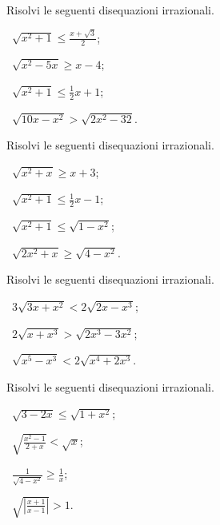 \begin{esercizio}[\Ast]
 \label{ese:8.23}
Risolvi le seguenti disequazioni irrazionali.
\begin{multicols}{2}
 \begin{enumeratea}
 \item~$\sqrt{x^2+1}\le \frac{x+\sqrt 3} 2$;
 \item~$\sqrt{x^2-5x}\ge x-4$;
 \item~$\sqrt{x^2+1}\le \frac 1 2x+1$;
 \item~$\sqrt{10x-x^2}>\sqrt{2x^2-32}$.
 \end{enumeratea}
 \end{multicols}
\end{esercizio}

\begin{esercizio}[\Ast]
 \label{ese:8.24}
Risolvi le seguenti disequazioni irrazionali.
\begin{multicols}{2}
 \begin{enumeratea}
 \item~$\sqrt{x^2+x}\ge x+3$;
 \item~$\sqrt{x^2+1}\le \frac 1 2x-1$;
 \item~$\sqrt{x^2+1}\le \sqrt{1-x^2}$;
 \item~$\sqrt{2x^2+x}\ge \sqrt{4-x^2}$.
 \end{enumeratea}
 \end{multicols}
\end{esercizio}
\pagebreak
\begin{esercizio}[\Ast]
 \label{ese:8.25}
Risolvi le seguenti disequazioni irrazionali.
\begin{multicols}{2}
 \begin{enumeratea}
 \item~$3\sqrt{3x+x^2}<2\sqrt{2x-x^3}$;
 \item~$2\sqrt{x+x^3}>\sqrt{2x^3-3x^2}$;
 \item~$\sqrt{x^5-x^3}<2\sqrt{x^4+2x^3}$.
 \end{enumeratea}
 \end{multicols}
\end{esercizio}

\begin{esercizio}[\Ast]
 \label{ese:8.26}
Risolvi le seguenti disequazioni irrazionali.
\begin{multicols}{2}
 \begin{enumeratea}
 \item~$\sqrt{3-2x}\le \sqrt{1+x^{2}}$;
 \item~$\sqrt{\frac{x^2-1}{2+x}}< \sqrt{x}$;
 \item~$\frac{1}{\sqrt{4-x^{2}}}\ge \frac{1}{x}$;
 \item~$\sqrt{\left|\frac{x+1}{x-1}\right|}> 1$.
 \end{enumeratea}
 \end{multicols}
\end{esercizio}

